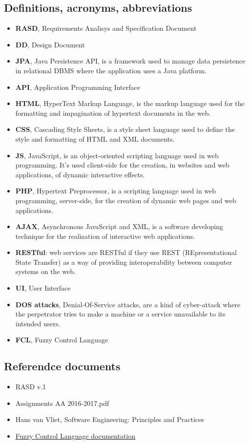 \subsection{Definitions, acronyms, abbreviations}
	\begin{itemize}
		\item \textbf{RASD}, Requirements Analisys and Specification Document
		\item \textbf{DD}, Design Document
		\item \textbf{JPA}, Java Persistence API, is a framework used to manage data persistence in relational DBMS where the application uses a Java platform.
		\item \textbf{API}, Application Programming Interface
		\item \textbf{HTML}, HyperText Markup Language, is the markup language used for the formatting and impagination of hypertext documents in the web.
		\item \textbf{CSS}, Cascading Style Sheets, is a style sheet language used to define the style and formatting of HTML and XML documents.
		\item \textbf{JS}, JavaScript, is an object-oriented scripting language used in web programming. It's used client-side for the creation, in websites and web applications, of dynamic interactive effects.
		\item \textbf{PHP}, Hypertext Preprocessor, is a scripting language used in web programming, server-side, for the creation of dynamic web pages and web applications.
		\item \textbf{AJAX}, Asynchronous JavaScript and XML, is a software developing technique for the realization of interactive web applications.
		\item \textbf{RESTful}: web services are RESTful if they use REST (REpresentational State Transfer) as a way of providing interoperability between computer systems on the web.
		\item \textbf{UI}, User Interface
		\item \textbf{DOS attacks}, Denial-Of-Service attacks, are a kind of cyber-attack where the perpetrator tries to make a machine or a service unavailable to its intended users.
		\item \textbf{FCL}, Fuzzy Control Language
	\end{itemize}

\subsection{Referendce documents}
	\begin{itemize}
		\item RASD v.1
		\item Assignments AA 2016-2017.pdf
		\item Hans van Vliet, Software Engineering: Principles and Practices
		\item \href{http://ffll.sourceforge.net/fcl.htm}{Fuzzy Control Language documentation}
	\end{itemize}

